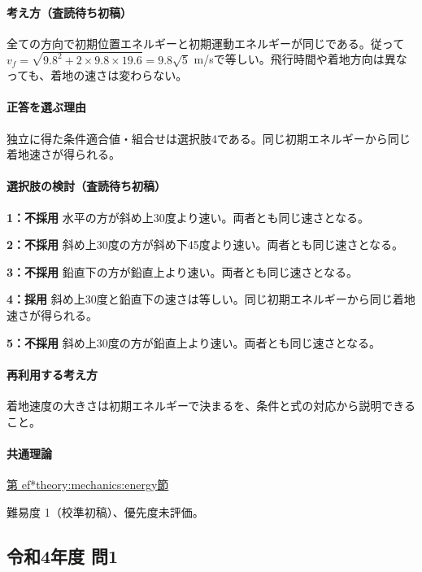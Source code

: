 \paragraph{考え方（査読待ち初稿）} 全ての方向で初期位置エネルギーと初期運動エネルギーが同じである。従って\(v_f=\sqrt{9.8^2+2\times9.8\times19.6}=9.8\sqrt5\) m/sで等しい。飛行時間や着地方向は異なっても、着地の速さは変わらない。

\paragraph{正答を選ぶ理由} 独立に得た条件適合値・組合せは選択肢4である。同じ初期エネルギーから同じ着地速さが得られる。

\paragraph{選択肢の検討（査読待ち初稿）}

\noindent\textbf{1：不採用} 水平の方が斜め上30度より速い。両者とも同じ速さとなる。\par

\noindent\textbf{2：不採用} 斜め上30度の方が斜め下45度より速い。両者とも同じ速さとなる。\par

\noindent\textbf{3：不採用} 鉛直下の方が鉛直上より速い。両者とも同じ速さとなる。\par

\noindent\textbf{4：採用} 斜め上30度と鉛直下の速さは等しい。同じ初期エネルギーから同じ着地速さが得られる。\par

\noindent\textbf{5：不採用} 斜め上30度の方が鉛直上より速い。両者とも同じ速さとなる。\par

\paragraph{再利用する考え方} 着地速度の大きさは初期エネルギーで決まるを、条件と式の対応から説明できること。

\paragraph{共通理論} \hyperref[theory:mechanics:energy]{第
ef*{theory:mechanics:energy}節}

\par 難易度 1（校準初稿）、優先度未評価。

\subsection{令和4年度 問1}
\label{q:r04-reg-applied-01}

